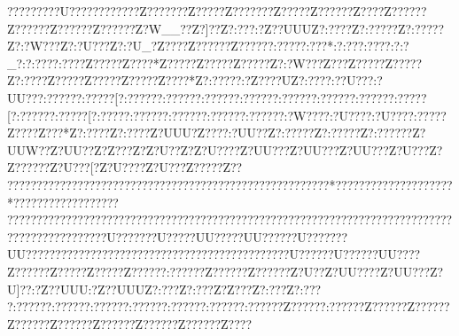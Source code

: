 {{{{{{{{{{{{{{{{{{{{{{{{{{{{{{{{{{{{{{{{{{{{{{{{{{{{{{{{{{{{{{{{{{{{{{{{{{{{{{{{{{{{{{{{{{{{{{{{{{{{{{{{{{{{{{{{{{{{{{{{{{{{{{{{{{{{{{{{{{{{{{{{{{{{{{{{{{{{{{{{{{{{{{{{{{{{{{{{{{{{{{{{{{{{{{{{{{{{{{{{{{{{{{{{{{{{{{{{{{{{{{{{{{{{{{{{{{{{{{{{{{{{{{{{{{{{{{{{{{{{{{{{{{{{{{{{{{{{{{{{{{{{{{{{{{{{{{{{{{{{{{{{{{{{{{{{{{{{{{{{{{{{{{{{{{{{{{{{{{{{{{{{{{{{{{{{{{{{{{{{{{{{{{{{{{{{{{{{{{{{{{{{{{{{{{{{{{{{{{{{{{{{{{{{{{{{{{{{{{{{{{{{{{{{{{{{{{{{{{{{{{{{{{{{{{{{{{{{{{{{{{{{{{{{{{{{{{{{{{{{{{{{{{{{{{{{{{{{{{{{{{{{{{{{{{{{{{{{{{{{{{{{{{{{{{{{{{{{{{{{{{{{{{{{{{{{{{{{{{{{{{{{{{{{{{{{{{{{{{{{{{{{{{{{{{{{{??{??????{?U?????{???????Z???????Z?????Z???????Z?????Z?????{?Z???{?Z?????{?Z?????{?Z?????{?Z?????{?Z?W__?{?Z?]??Z?:???  :?Z??UUUZ?:???? Z?:?????Z?:?????Z?:?W???Z?:?U???Z?:?U_?Z????Z??????Z??????:?????  :???*  :?:???  :????  :?:?_?  :?:???? :????  Z????? Z????* Z?????Z????? Z????? Z?:?W???Z??? Z????? Z????? Z?:???? Z????? Z????? Z????? Z????* Z?:?????:?Z????UZ?:???{?:??U??{?:?UU??{?:?????{?:?????[?:?????{?:?????{?:?????{?:?????{?:?????{?:?????{?:?????{?:?????[?:?????{?:?????[?:????{?:?????{?:?????{?:?????{?:?????{?:?W???{?:?U???{?:?U???{?:?????Z????  Z???*  Z?:???? Z?:???  {?Z?UUU?Z?{?   ?{?:?UU??Z?:?????Z?:?????Z?:?????{?Z?UUW?{?Z?UU??Z?Z?  ??Z?Z?U??Z?Z?U???{?Z?UU??{?Z?UU??{?Z?UU??{?Z?U???Z?Z?????{?Z?U???[?Z?U???{?Z?U???Z?{? ???Z?{? ??????????????????????????????????????? ??????????? ?????*?????????????? ??????* ??????  ??????  ??????  ????? ??????? ??????? ??????????????????????????????????????????????????????????????????????????U???????U?????UU?????UU??????U???????UU????{???  ??{???  ??{???? ??{??????{?????{???????{??????{?U?????{?U?????{?UU????Z?????{?Z???? {?Z???? {?Z??????:?????{?Z?????{?Z?????{?Z?U??Z?UU????Z?UU??{?Z?U]??:?Z??UUU:?Z??UUUZ?:???  Z?:???  Z?Z???  Z?:???  Z?:???  {?:?????{?:?????{?:?????{?:?????{?:?????{?:?????{?:?????{?Z?????{?:?????{?Z?????{?Z?????{?Z?????{?Z?????{?Z?????{?Z?????{?Z?????{?Z????
}}}}}}}}}}}}}}}}}}}}}}}}}}}}}}}}}}}}}}}}}}}}}}}}}}}}}}}}}}}}}}}}}}}}}}}}}}}}}}}}}}}}}}}}}}}}}}}}}}}}}}}}}}}}}}}}}}}}}}}}}}}}}}}}}}}}}}}}}}}}}}}}}}}}}}}}}}}}}}}}}}}}}}}}}}}}}}}}}}}}}}}}}}}}}}}}}}}}}}}}}}}}}}}}}}}}}}}}}}}}}}}}}}}}}}}}}}}}}}}}}}}}}}}}}}}}}}}}}}}}}}}}}}}}}}}}}}}}}}}}}}}}}}}}}}}}}}}}}}}}}}}}}}}}}}}}}}}}}}}}}}}}}}}}}}}}}}}}}}}}}}}}}}}}}}}}}}}}}}}}}}}}}}}}}}}}}}}}}}}}}}}}}}}}}}}}}}}}}}}}}}}}}}}}}}}}}}}}}}}}}}}}}}}}}}}}}}}}}}}}}}}}}}}}}}}}}}}}}}}}}}}}}}}}}}}}}}}}}}}}}}}}}}}}}}}}}}}}}}}}}}}}}}}}}}}}}}}}}}}}}}}}}}}}}}}}}}}}}}}}}}}}}}}}}}}}}}}}}}}}}}}}}}}}}}}}}}}}}}}}}}}}}}}}}}}}}}}}}}}}}}}}}}}}}}}}}}}}}}}}}}}}}}}}}}}}}}}}}}}}}}}}}}}}}}}}}}}}}}}}}}}}}}}}}}
